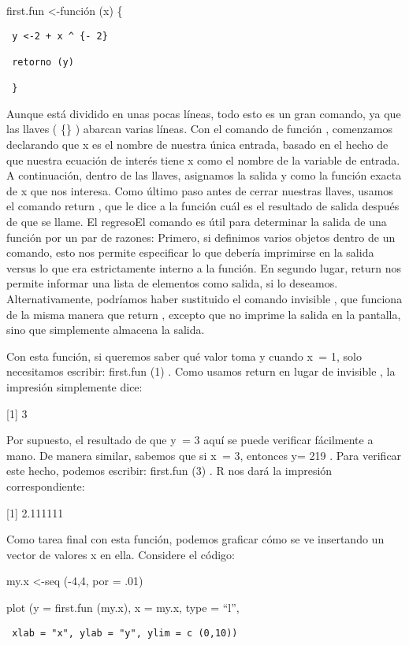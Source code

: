 \documentclass[
]{book}
\begin{document}
first.fun \textless-función (x) \{

\begin{verbatim}
 y <-2 + x ^ {- 2}

 retorno (y)

 }
\end{verbatim}

Aunque está dividido en unas pocas líneas, todo esto es un gran comando, ya que las llaves ( \{\} ) abarcan varias líneas. Con el comando de función , comenzamos declarando que x es el nombre de nuestra única entrada, basado en el hecho de que nuestra ecuación de interés tiene x como el nombre de la variable de entrada. A continuación, dentro de las llaves, asignamos la salida y como la función exacta de x que nos interesa. Como último paso antes de cerrar nuestras llaves, usamos el comando return , que le dice a la función cuál es el resultado de salida después de que se llame. El regresoEl comando es útil para determinar la salida de una función por un par de razones: Primero, si definimos varios objetos dentro de un comando, esto nos permite especificar lo que debería imprimirse en la salida versus lo que era estrictamente interno a la función. En segundo lugar, return nos permite informar una lista de elementos como salida, si lo deseamos. Alternativamente, podríamos haber sustituido el comando invisible , que funciona de la misma manera que return , excepto que no imprime la salida en la pantalla, sino que simplemente almacena la salida.

Con esta función, si queremos saber qué valor toma y cuando x  = 1, solo necesitamos escribir: first.fun (1) . Como usamos return en lugar de invisible , la impresión simplemente dice:

{[}1{]} 3

Por supuesto, el resultado de que y  = 3 aquí se puede verificar fácilmente a mano. De manera similar, sabemos que si x  = 3, entonces y= 219 . Para verificar este hecho, podemos escribir: first.fun (3) . R nos dará la impresión correspondiente:

{[}1{]} 2.111111

Como tarea final con esta función, podemos graficar cómo se ve insertando un vector de valores x en ella. Considere el código:

my.x \textless-seq (-4,4, por = .01)

plot (y = first.fun (my.x), x = my.x, type = ``l'',

\begin{verbatim}
 xlab = "x", ylab = "y", ylim = c (0,10))
\end{verbatim}
\end{document}
